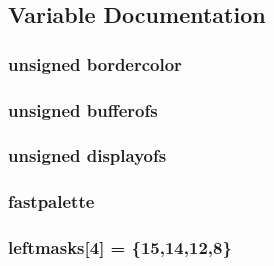 \subsection{Variable Documentation}
\hypertarget{ID__VL_8C_a7d243f7a427ebc7df3533c0cd5760971}{
\subsubsection[{bordercolor}]{\setlength{\rightskip}{0pt plus 5cm}unsigned {\bf bordercolor}}}
\label{ID__VL_8C_a7d243f7a427ebc7df3533c0cd5760971}
\hypertarget{ID__VL_8C_a95b7c90690730f0b09409f1fb8ef3730}{
\subsubsection[{bufferofs}]{\setlength{\rightskip}{0pt plus 5cm}unsigned {\bf bufferofs}}}
\label{ID__VL_8C_a95b7c90690730f0b09409f1fb8ef3730}
\hypertarget{ID__VL_8C_ae69449df2121a068cc86de491d7b5956}{
\subsubsection[{displayofs}]{\setlength{\rightskip}{0pt plus 5cm}unsigned {\bf displayofs}}}
\label{ID__VL_8C_ae69449df2121a068cc86de491d7b5956}
\hypertarget{ID__VL_8C_a675e190adb49e5f2beb6eac8c743e5df}{
\subsubsection[{fastpalette}]{ {\bf fastpalette}}}
\label{ID__VL_8C_a675e190adb49e5f2beb6eac8c743e5df}
\hypertarget{ID__VL_8C_aee788d5b07d9018f62d16a6a04bada6c}{
\subsubsection[{leftmasks}]{ {\bf leftmasks}\mbox{[}4\mbox{]} = \{15,14,12,8\}}}
\label{ID__VL_8C_aee788d5b07d9018f62d16a6a04bada6c}
